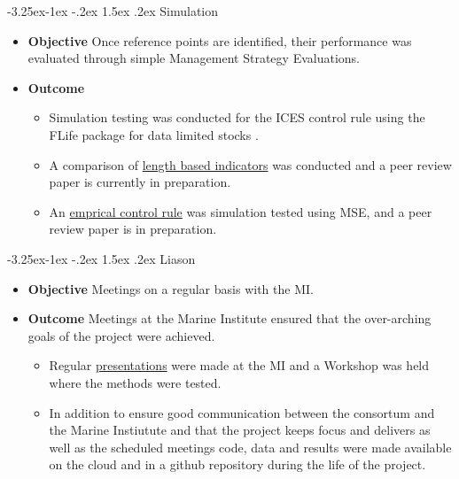 \documentclass[a4paper, 10pt]{article}
\makeatletter
\renewcommand{\subsection}{\@startsection{subsection}{2}{\z@}%
 {-3.25ex\@plus -1ex \@minus -.2ex}%
 {1.5ex \@plus .2ex}%
 {\normalfont\bfseries\slshape}}
\makeatother
\begin{document}
\subsection{Simulation}

\begin{itemize}[labelindent=\parindent,noitemsep,topsep=0pt,parsep=0pt,partopsep=0pt]
 \item \textbf{Objective} Once reference points are identified, their performance was evaluated through simple Management Strategy Evaluations.
 \item \textbf{Outcome} 
 \begin{itemize}
 \item Simulation testing was conducted for the ICES control rule using the FLife package for data limited stocks \citep{fischer2019hcr}.
 \item A comparison of \href{https://3o2y9wugzp1kfxr5hvzgzq-on.drv.tw/MyDas/papers/roc/roc.html}{length based indicators} was conducted and a peer review paper is currently in preparation.
 \item An \href{https://3o2y9wugzp1kfxr5hvzgzq-on.drv.tw/MyDas/papers/pareto/pareto.html}{emprical control rule} was simulation tested using MSE, and a peer review paper is in preparation.
  \end{itemize} 
\end{itemize}


\subsection{Liason}

\begin{itemize}[labelindent=\parindent,noitemsep,topsep=0pt,parsep=0pt,partopsep=0pt]
 \item \textbf{Objective} Meetings on a regular basis with the MI.
 \item \textbf{Outcome} 
 Meetings at the Marine Institute ensured that the over-arching goals of the project were achieved.
 \begin{itemize}
  \item  Regular \href{https://3o2y9wugzp1kfxr5hvzgzq-on.drv.tw/MyDas/presentations.html}{presentations} were made at the MI and a Workshop was held where the methods were tested.
 \item In addition to ensure good communication between the consortum and the Marine Instiutute and that the project keeps focus and delivers as well as the scheduled meetings code, data and results were made available on the cloud and in a github repository during the life of the project.
 \end{itemize}
\end{itemize}
\end{document}
